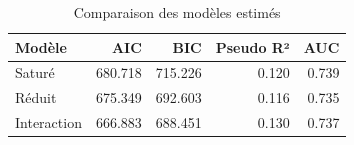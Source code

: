 \begin{table}
\caption{Comparaison des modèles estimés}
\label{tab:comparaison_modeles}
\begin{tabular}{lrrrr}
\toprule
Modèle & AIC & BIC & Pseudo R² & AUC \\
\midrule
Saturé & 680.718 & 715.226 & 0.120 & 0.739 \\
Réduit & 675.349 & 692.603 & 0.116 & 0.735 \\
Interaction & 666.883 & 688.451 & 0.130 & 0.737 \\
\bottomrule
\end{tabular}
\end{table}

